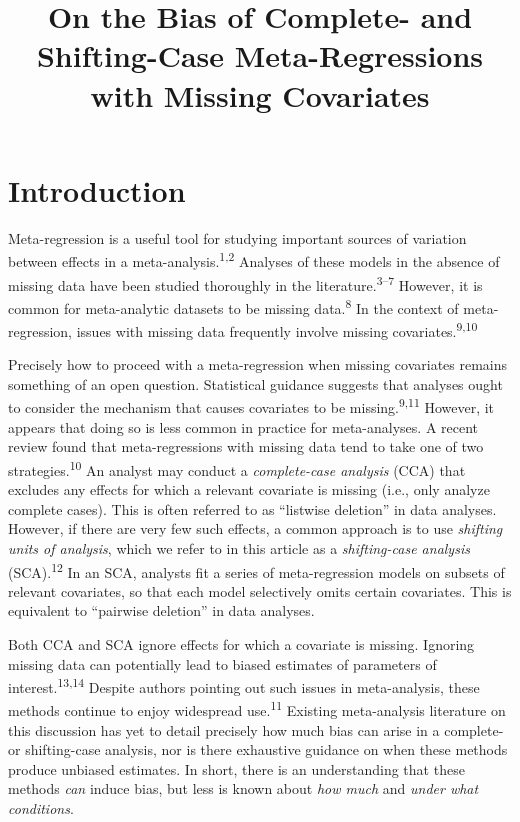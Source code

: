 \documentclass[
]{article}
\title{On the Bias of Complete- and Shifting-Case Meta-Regressions with Missing Covariates}
\author{}
\date{\vspace{-2.5em}}
\begin{document}
\maketitle

\hypertarget{introduction}{%
\section{Introduction}\label{introduction}}

Meta-regression is a useful tool for studying important sources of variation between effects in a meta-analysis.\textsuperscript{1,2}
Analyses of these models in the absence of missing data have been studied thoroughly in the literature.\textsuperscript{3--7}
However, it is common for meta-analytic datasets to be missing data.\textsuperscript{8}
In the context of meta-regression, issues with missing data frequently involve missing covariates.\textsuperscript{9,10}

Precisely how to proceed with a meta-regression when missing covariates remains something of an open question.
Statistical guidance suggests that analyses ought to consider the mechanism that causes covariates to be missing.\textsuperscript{9,11}
However, it appears that doing so is less common in practice for meta-analyses.
A recent review found that meta-regressions with missing data tend to take one of two strategies.\textsuperscript{10}
An analyst may conduct a \emph{complete-case analysis} (CCA) that excludes any effects for which a relevant covariate is missing (i.e., only analyze complete cases).
This is often referred to as ``listwise deletion'' in data analyses.
However, if there are very few such effects, a common approach is to use \emph{shifting units of analysis}, which we refer to in this article as a \emph{shifting-case analysis} (SCA).\textsuperscript{12}
In an SCA, analysts fit a series of meta-regression models on subsets of relevant covariates, so that each model selectively omits certain covariates.
This is equivalent to ``pairwise deletion'' in data analyses.

Both CCA and SCA ignore effects for which a covariate is missing.
Ignoring missing data can potentially lead to biased estimates of parameters of interest.\textsuperscript{13,14}
Despite authors pointing out such issues in meta-analysis, these methods continue to enjoy widespread use.\textsuperscript{11}
Existing meta-analysis literature on this discussion has yet to detail precisely how much bias can arise in a complete- or shifting-case analysis, nor is there exhaustive guidance on when these methods produce unbiased estimates.
In short, there is an understanding that these methods \emph{can} induce bias, but less is known about \emph{how much} and \emph{under what conditions}.
\end{document}
